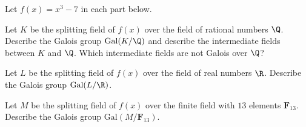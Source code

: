Let $f(x)=x^3-7$ in each part below.
\begin{alist}
\item Let $K$ be the splitting field of $f(x)$ over the field of
rational numbers $\Q$. Describe the Galois group $\text{Gal}(K/\Q)$
and describe the intermediate fields between $K$ and $\Q$. Which
intermediate fields are not Galois over $\Q$?
\item Let $L$ be the splitting field of $f(x)$ over the field of real
numbers $\R$. Describe the Galois group $\text{Gal}(L/\R)$.
\item Let $M$ be the splitting field of $f(x)$ over the finite field
with $13$ elements $\mathbf{F}_{13}$. Describe the Galois group
$\text{Gal}(M/\mathbf{F}_{13})$.
\end{alist}
